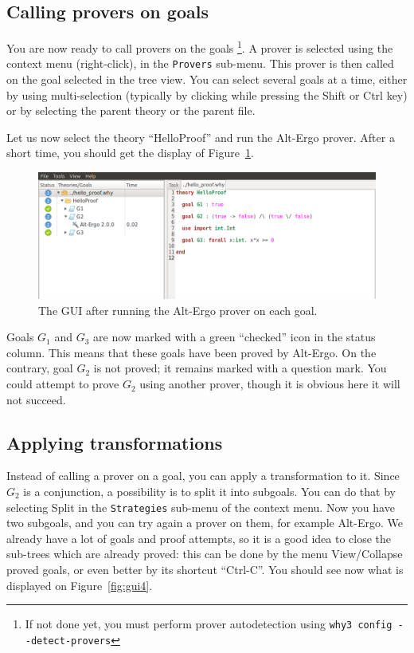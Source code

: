 \subsection{Calling provers on goals}

You are now ready to call provers on the goals
\footnote{If not done yet, you
  must perform prover autodetection using \texttt{why3 config
    -{}-detect-provers}}.
A prover is selected using the context menu (right-click), in the
\texttt{Provers} sub-menu.
This prover is then called on the goal selected
in the tree view. You can select several goals at a time, either
by using multi-selection (typically by clicking while pressing the
\textsf{Shift} or \textsf{Ctrl} key) or by selecting the parent theory
or the parent file.

Let us now select the theory ``HelloProof'' and
run the Alt-Ergo prover. After a short time, you should
get the display of Figure~\ref{fig:gui3}.
\begin{figure}[tbp]
\includegraphics[width=\textwidth]{gui-3.png}
  \caption{The GUI after running the Alt-Ergo prover on each goal.}
  \label{fig:gui3}
\end{figure}
Goals $G_1$ and $G_3$ are now marked with a green ``checked'' icon in the
status column. This means that these goals have been proved by Alt-Ergo.
On the contrary, goal $G_2$ is not proved; it remains
marked with a question mark.
You could attempt to prove $G_2$ using another prover, though it is
obvious here it will not succeed.

\subsection{Applying transformations}

Instead of calling a prover on a goal, you can apply a transformation
to it.  Since $G_2$ is a conjunction, a possibility is to split it
into subgoals. You can do that by selecting \textsf{Split} in the
\texttt{Strategies} sub-menu of the context menu. Now you have two
subgoals, and you can try again a prover on them, for example
Alt-Ergo. We already have a lot of goals and proof attempts, so it is
a good idea to close the sub-trees which are already proved: this can
be done by the menu \textsf{View/Collapse proved goals}, or even
better by its shortcut ``Ctrl-C''.  You should see now what is
displayed on Figure~\ref{fig:gui4}.


